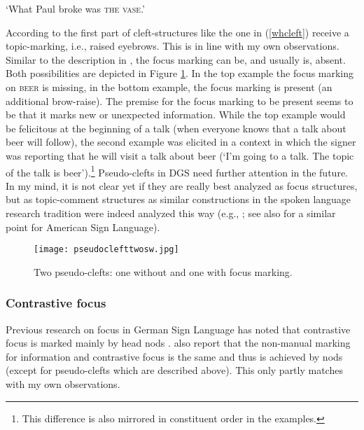 \begin{exe}
\ex {} 
\glt `What Paul broke was \textsc{the vase}.' \label{whcleft}
\end{exe}

\noindent According to \citet[397]{happ2014vork} the first part of cleft-structures like the one in (\ref{whcleft}) receive a topic-marking, i.e., raised eyebrows. This is in line with my own observations. Similar to the description in \citet[397]{happ2014vork}, the focus marking can be, and usually is, absent. Both possibilities are depicted in Figure \ref{pseudocleft}. In the top example the focus marking on \textsc{beer} is missing, in the bottom example, the focus marking is present (an additional brow-raise). The premise for the focus marking to be present seems to be that it marks new or unexpected information. While the top example would be felicitous at the beginning of a talk (when everyone knows that a talk about beer will follow), the second example was elicited in a context in which the signer was reporting that he will visit a talk about beer (`I'm going to a talk. The topic of the talk is beer').\footnote{This difference is also mirrored in constituent order in the examples.} Pseudo-clefts in DGS need further attention in the future. In my mind, it is not clear yet if they are really best analyzed as focus structures, but as topic-comment structures as similar constructions in the spoken language research tradition were indeed analyzed this way (e.g., \citealt{prince1978,gast2014}; see also \citealt{caponigro2011ask} for a similar point for American Sign Language).

\begin{figure}[bt]
\centering
	\texttt{[image: pseudoclefttwosw.jpg]}
	\caption{Two pseudo-clefts: one without and one with focus marking.}
	\label{pseudocleft}
\end{figure}

\largerpage
\subsubsection{Contrastive focus}\label{contrastivefocussubection}
Previous research on focus in German Sign Language has noted that contrastive focus is marked mainly by head nods \citep{waleschkowski2009}. \citet[402--403]{happ2014vork} also report that the non-manual marking for information and contrastive focus is the same and thus is achieved by nods (except for pseudo-clefts which are described above). This only partly matches with my own observations.


